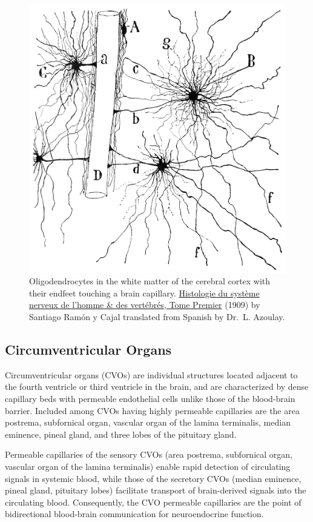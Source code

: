 \begin{figure}

{\centering \includegraphics[width=0.7\linewidth]{./figures/cns/ologodendrocytes_vessel} 

}

\caption{Oligodendrocytes in the white matter of the cerebral cortex with their endfeet touching a brain capillary. \href{https://wellcomelibrary.org/item/b2129592x\#?c=0\&m=0\&s=0\&cv=14\&z=0\%2C-3.48\%2C1\%2C8.6591}{Histologie du système nerveux de l'homme \& des vertébrés, Tome Premier} (1909) by Santiago Ramón y Cajal translated from Spanish by Dr.~L. Azoulay.}\label{fig:oligobbb}
\end{figure}

\hypertarget{circumventricular-organs}{%
\subsection{Circumventricular Organs}\label{circumventricular-organs}}

Circumventricular organs (CVOs) are individual structures located adjacent to the fourth ventricle or third ventricle in the brain, and are characterized by dense capillary beds with permeable endothelial cells unlike those of the blood-brain barrier. Included among CVOs having highly permeable capillaries are the area postrema, subfornical organ, vascular organ of the lamina terminalis, median eminence, pineal gland, and three lobes of the pituitary gland.

Permeable capillaries of the sensory CVOs (area postrema, subfornical organ, vascular organ of the lamina terminalis) enable rapid detection of circulating signals in systemic blood, while those of the secretory CVOs (median eminence, pineal gland, pituitary lobes) facilitate transport of brain-derived signals into the circulating blood. Consequently, the CVO permeable capillaries are the point of bidirectional blood-brain communication for neuroendocrine function.


